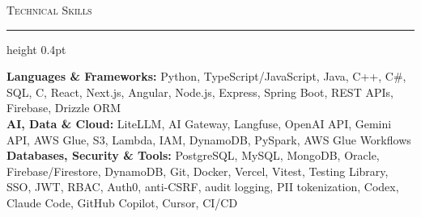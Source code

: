 \documentclass[letterpaper,11pt]{article}
\newcommand{\resumesection}[1]{%
  \par\vspace{2pt}%
  {\large\scshape #1}\par\vspace{2pt}%
  \hrule height 0.4pt\vspace{2pt}%
}
\begin{document}
\resumesection{Technical Skills}
\textbf{Languages \& Frameworks:} Python, TypeScript/JavaScript, Java, C++, C\#, SQL, C, React, Next.js, Angular, Node.js, Express, Spring Boot, REST APIs, Firebase, Drizzle ORM\\
\textbf{AI, Data \& Cloud:} LiteLLM, AI Gateway, Langfuse, OpenAI API, Gemini API, AWS Glue, S3, Lambda, IAM, DynamoDB, PySpark, AWS Glue Workflows\\
\textbf{Databases, Security \& Tools:} PostgreSQL, MySQL, MongoDB, Oracle, Firebase/Firestore, DynamoDB, Git, Docker, Vercel, Vitest, Testing Library, SSO, JWT, RBAC, Auth0, anti-CSRF, audit logging, PII tokenization, Codex, Claude Code, GitHub Copilot, Cursor, CI/CD
\end{document}
